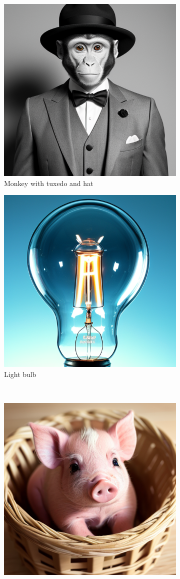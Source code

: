 \begin{figure}
    \centering
    \begin{subfigure}{0.5\textwidth}
        \centering
        \includegraphics[width=0.5\linewidth]{images/sd1.png}
        \caption[Monkey with tuxedo and hat]%
        {{\small Monkey with tuxedo and hat}}    
        \label{fig:sd1}
    \end{subfigure}%
    \begin{subfigure}{0.5\textwidth}  
        \centering 
        \includegraphics[width=0.5\linewidth]{images/sd2.png}
        \caption[Light bulb]%
        {{\small Light bulb}}    
        \label{fig:sd2}
    \end{subfigure}\\
    \begin{subfigure}{0.5\linewidth}   
        \centering 
        \includegraphics[width=0.5\linewidth]{images/sd3.png}

\end{subfigure}
\end{figure}
